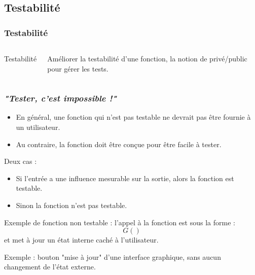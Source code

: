 \documentclass{beamer}
\begin{document}
\subsection{Testabilité}

\begin{frame}
\frametitle{Testabilité}
  \begin{columns}
    
    {\huge{Testabilité}}
	
	Améliorer la testabilité d'une fonction, 
	la notion de privé/public pour gérer les tests. 
  \end{columns}
\end{frame}


\begin{frame}[containsverbatim]
\frametitle{\emph{"Tester, c'est impossible !"}}

\begin{itemize}
\item En général, une fonction qui n'est pas testable ne devrait pas 
être fournie à un utilisateur.
\item Au contraire, la fonction doit être conçue pour être facile à 
tester. 
\end{itemize}

Deux cas :
\begin{itemize}
\item Si l'entrée a une influence mesurable sur la sortie, alors 
la fonction est testable.
\item Sinon la fonction n'est pas testable. 
\end{itemize}

Exemple de fonction non testable : l'appel à la fonction est 
sous la forme :
$$
G()
$$
et met à jour un état interne caché à l'utilisateur. 

Exemple : bouton "mise à jour" d'une interface graphique, sans 
aucun changement de l'état externe.

\end{frame}

\end{document}
